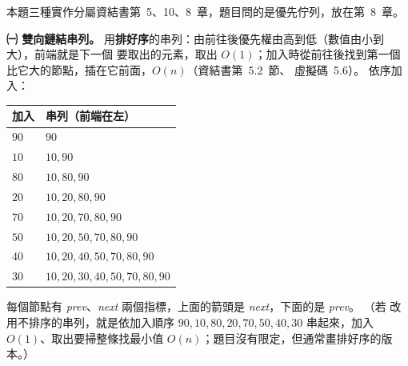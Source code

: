 \begin{pastsoln}
本題三種實作分屬資結書第~5、10、8~章，題目問的是優先佇列，放在第~8~章。

\textbf{㈠ 雙向鏈結串列。} 用\textbf{排好序}的串列：由前往後優先權由高到低（數值由小到大），前端就是下一個
要取出的元素，取出 $O(1)$；加入時從前往後找到第一個比它大的節點，插在它前面，$O(n)$（資結書第~5.2~節、
虛擬碼~5.6）。 依序加入：
\begin{center}
\begin{tabular}{ll}
\toprule
加入 & 串列（前端在左） \\
\midrule
$90$ & $90$ \\
$10$ & $10, 90$ \\
$80$ & $10, 80, 90$ \\
$20$ & $10, 20, 80, 90$ \\
$70$ & $10, 20, 70, 80, 90$ \\
$50$ & $10, 20, 50, 70, 80, 90$ \\
$40$ & $10, 20, 40, 50, 70, 80, 90$ \\
$30$ & $10, 20, 30, 40, 50, 70, 80, 90$ \\
\bottomrule
\end{tabular}
\end{center}
\begin{center}
\end{center}
每個節點有 \textit{prev}、\textit{next} 兩個指標，上面的箭頭是 \textit{next}，下面的是 \textit{prev}。 （若
改用不排序的串列，就是依加入順序 $90, 10, 80, 20, 70, 50, 40, 30$ 串起來，加入 $O(1)$、取出要掃整條找最小值
$O(n)$；題目沒有限定，但通常畫排好序的版本。）


\end{pastsoln}
